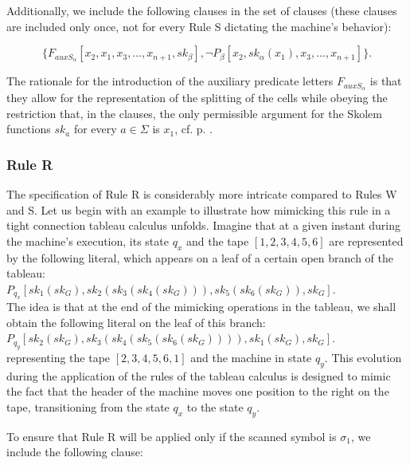 \documentclass[%
  manuscript=article,   %
  year=2024,
  volume=77,
  doi=10.59203/zfn.77.694,
]{zfn}
\begin{document}
Additionally, we include the following clauses in the set of clauses (these clauses are included only once, not for every Rule S dictating the machine's behavior):

\begin{equation}
 \{F_{auxS_{\alpha}}[x_2, x_1, x_3, \ldots, x_{n+1}, sk_\beta], \neg P_\beta[x_2, sk_\alpha(x_1), x_3, \ldots, x_{n+1}]\}.
\end{equation}

The rationale for the introduction of the auxiliary predicate letters $F_{auxS_{\alpha}}$ is that they allow for the representation of the splitting of the cells while obeying the restriction that, in the clauses, the only permissible argument for the Skolem functions $sk_a$ for every $a \in \Sigma$ is $x_1$, cf. p. \pageref{x1rest}.

\subsubsection{Rule R}

The specification of Rule R is considerably more intricate compared to Rules W and S. Let us begin with an example to illustrate how mimicking this rule in a tight connection tableau calculus unfolds. Imagine that at a given instant during the machine's execution, its state $q_x$ and the tape $[1,2,3,4,5,6]$ are represented by the following literal, which appears on a leaf of a certain open branch of the tableau:\\

$P_{q_x}[sk_1(sk_G), sk_2(sk_3(sk_4(sk_G))), sk_5(sk_6(sk_G)), sk_G].$\\

The idea is that at the end of the mimicking operations in the tableau, we shall obtain the following literal on the leaf of this branch:\\

$P_{q_y}[sk_2(sk_G), sk_3(sk_4(sk_5(sk_6(sk_G)))), sk_1(sk_G), sk_G].$\\

\noindent representing the tape $[2,3,4,5,6,1]$ and the machine in state $q_y$. This evolution during the application of the rules of the tableau calculus is designed to mimic the fact that the header of the machine moves one position to the right on the tape, transitioning from the state $q_x$ to the state $q_y$.

To ensure that Rule R will be applied only if the scanned symbol is $\sigma_1$, we include the following clause:
\end{document}
